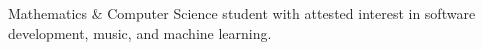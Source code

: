 Mathematics \& Computer Science student with attested interest in software development, music, and machine learning.